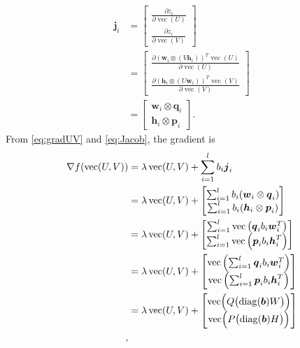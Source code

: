 \documentclass[11pt,twoside]{article}
\newcommand{\bsym}[1]{\ensuremath{\boldsymbol{#1}}}
\newcommand{\bw}{\ensuremath{\bsym{w}}}
\newcommand{\bj}{\ensuremath{\bsym{j}}}
\newcommand{\bp}{\ensuremath{\bsym{p}}}
\newcommand{\bq}{\ensuremath{\bsym{q}}}
\newcommand{\bh}{\ensuremath{\bsym{h}}}
\DeclareMathOperator*{\diag}{diag}
\DeclareMathOperator*{\vectorize}{vec}
\begin{document}
\begin {align}
\bj_i &= \begin{bmatrix} \frac{\partial z_i}{\partial \vectorize(U)} \\ \frac{\partial z_i}{\partial \vectorize(V)} \end{bmatrix}\nonumber \\
&= \begin{bmatrix} \frac{\partial (\bw_i \otimes (V \bh_i))^T\vectorize(U)}{\partial \vectorize(U)} \\ \frac{\partial (\bh_i \otimes (U \bw_i))^T\vectorize(V)}{\partial \vectorize(V)} \end{bmatrix}\nonumber \\
&= \begin{bmatrix} \bw_i\otimes \bq_i \\ \bh_i\otimes \bp_i \end{bmatrix}
\label{eq:Jacob}.
\end{align}
From \eqref{eq:gradUV} and \eqref{eq:Jacob}, the gradient is
\begin {align}
\nabla {f}(\vectorize(U, V)) 
&= \lambda \vectorize(U,V) + \sum_{i=1}^l b_i \bj_i\nonumber\\
&= \lambda \vectorize(U,V) + \begin{bmatrix} \sum_{i=1}^l b_i (\bw_i\otimes\bq_i) \\ \sum_{i=1}^l b_i (\bh_i\otimes\bp_i)\end{bmatrix}\label{eq:GradU_K1}\\
&= \lambda \vectorize(U,V) + \begin{bmatrix} \sum_{i=1}^l \vectorize\left(\bq_i b_i \bw_i^T \right) \\ \sum_{i=1}^l \vectorize\left(\bp_i b_i \bh_i^T \right)\end{bmatrix}\label{eq:GradU_K2}\\
&= \lambda \vectorize(U,V) + \begin{bmatrix} \vectorize\left( \sum_{i=1}^l \bq_i b_i \bw_i^T \right) \\ \vectorize\left( \sum_{i=1}^l \bp_i b_i \bh_i^T \right)\end{bmatrix}\nonumber\\
&= \lambda \vectorize(U,V) + \begin{bmatrix} \vectorize \Bigl ( Q \bigl(\diag(\bsym{b}) W \bigr)  \Bigr) \\ \vectorize \Bigl ( P \bigl(\diag(\bsym{b}) H \bigr)  \Bigr)\end{bmatrix}\nonumber\\
\label{eq:Grad},
\end{align}
\end{document}
